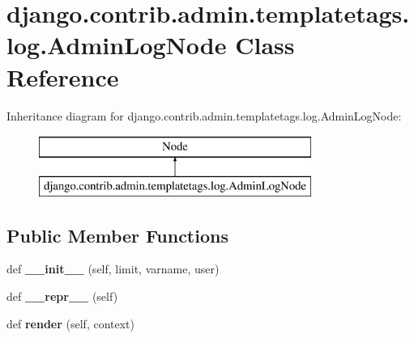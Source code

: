 \hypertarget{classdjango_1_1contrib_1_1admin_1_1templatetags_1_1log_1_1_admin_log_node}{}\section{django.\+contrib.\+admin.\+templatetags.\+log.\+Admin\+Log\+Node Class Reference}
\label{classdjango_1_1contrib_1_1admin_1_1templatetags_1_1log_1_1_admin_log_node}
Inheritance diagram for django.\+contrib.\+admin.\+templatetags.\+log.\+Admin\+Log\+Node\+:\begin{figure}[H]
\begin{center}
\leavevmode
\includegraphics[height=2.000000cm]{classdjango_1_1contrib_1_1admin_1_1templatetags_1_1log_1_1_admin_log_node}
\end{center}
\end{figure}
\subsection*{Public Member Functions}
\begin{DoxyCompactItemize}
\item 
\mbox{\label{classdjango_1_1contrib_1_1admin_1_1templatetags_1_1log_1_1_admin_log_node_a73a92fc7b6692d51f067fec05b461135}} 
def {\bfseries \+\_\+\+\_\+init\+\_\+\+\_\+} (self, limit, varname, user)
\item 
\mbox{\label{classdjango_1_1contrib_1_1admin_1_1templatetags_1_1log_1_1_admin_log_node_adf0d812e579540ed83e696f9e76d1d20}} 
def {\bfseries \+\_\+\+\_\+repr\+\_\+\+\_\+} (self)
\item 
\mbox{\label{classdjango_1_1contrib_1_1admin_1_1templatetags_1_1log_1_1_admin_log_node_a0f81ece6b4927d4685c79478a079e6e7}} 
def {\bfseries render} (self, context)
\end{DoxyCompactItemize}
